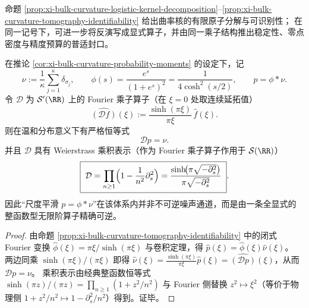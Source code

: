 %

命题 \ref{prop:xi-bulk-curvature-logistic-kernel-decomposition}--\ref{prop:xi-bulk-curvature-tomography-identifiability} 给出曲率核的有限原子分解与可识别性；
在同一记号下，可进一步将反演写成显式算子，并由同一乘子结构推出稳定性、零点密度与精度预算的普适封口。

\begin{proposition}\label{prop:xi-bulk-curvature-exact-deconvolution-operator}
在推论 \ref{cor:xi-bulk-curvature-probability-moments} 的设定下，记
\[
\nu:=\frac{1}{\kappa}\sum_{j=1}^{\kappa}\delta_{\sigma_j},
\qquad
\phi(s)=\frac{e^{s}}{(1+e^{s})^{2}}=\frac{1}{4\cosh^{2}(s/2)},
\qquad
p=\phi*\nu.
\]
令 \(\mathcal D\) 为 \(\mathcal S'(\RR)\) 上的 Fourier 乘子算子（在 \(\xi=0\) 处取连续延拓值）
\[
\widehat{(\mathcal D f)}(\xi):=\frac{\sinh(\pi\xi)}{\pi\xi}\,\widehat f(\xi).
\]
则在温和分布意义下有严格恒等式
\[
\boxed{\;\mathcal D p=\nu.\;}
\]
并且 \(\mathcal D\) 具有 Weierstrass 乘积表示（作为 Fourier 乘子算子作用于 \(\mathcal S(\RR)\)）
\[
\boxed{\;
\mathcal D=\prod_{n\ge1}\Bigl(1-\frac{1}{n^{2}}\partial_{s}^{2}\Bigr)
=\frac{\sinh\!\bigl(\pi\sqrt{-\partial_{s}^{2}}\bigr)}{\pi\sqrt{-\partial_{s}^{2}}}\; }.
\]
因此“尺度平滑 \(p=\phi*\nu\)”在该体系内并非不可逆噪声通道，而是由一条全显式的整函数型无限阶算子精确可逆。
\end{proposition}
\begin{proof}
由命题 \ref{prop:xi-bulk-curvature-tomography-identifiability} 中的闭式 Fourier 变换
\(
\widehat\phi(\xi)=\pi\xi/\sinh(\pi\xi)
\)
与卷积定理，得
\(
\widehat p(\xi)=\widehat\phi(\xi)\widehat\nu(\xi)
\)。
两边同乘 \(\sinh(\pi\xi)/(\pi\xi)\) 即得
\(
\widehat\nu(\xi)=\frac{\sinh(\pi\xi)}{\pi\xi}\widehat p(\xi)
=\widehat{(\mathcal D p)}(\xi)
\)，从而 \(\mathcal Dp=\nu\)。
乘积表示由经典整函数恒等式
\(
\sinh(\pi z)/(\pi z)=\prod_{n\ge1}(1+z^{2}/n^{2})
\)
与 Fourier 侧替换 \(z^{2}\mapsto \xi^{2}\)（等价于物理侧 \(1+z^{2}/n^{2}\mapsto 1-\partial_{s}^{2}/n^{2}\)）得到。证毕。
\end{proof}


